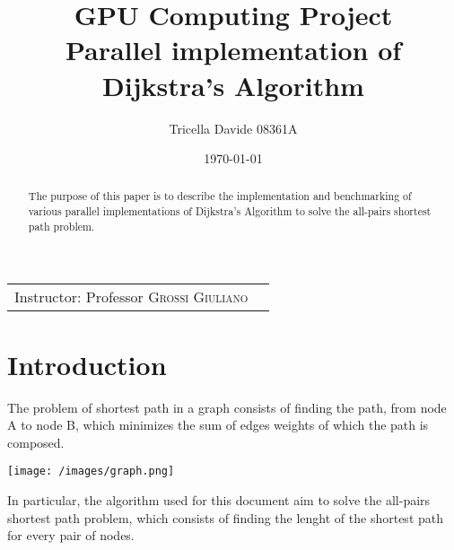 \documentclass[
	a4paper, %
	12pt, %
]{class}
\title{GPU Computing Project\\Parallel implementation of Dijkstra's Algorithm} %
\author{Tricella Davide 08361A} %
\date{\today} %
\begin{document}
\maketitle %

\begin{center}
    \begin{tabular}{l r}
        Instructor: Professor \textsc{Grossi Giuliano}
    \end{tabular}
\end{center}


\begin{abstract}
    The purpose of this paper is to describe the implementation and benchmarking of various parallel implementations of Dijkstra's Algorithm to solve the all-pairs shortest path problem.
\end{abstract}


\tableofcontents
\newpage

\section{Introduction}

The problem of shortest path in a graph consists of finding the path, from node A to node B,
which minimizes the sum of edges weights of which the path is composed.\\

\begin{center}
    \texttt{[image: /images/graph.png]}
\end{center}

In particular, the algorithm used for this document aim to solve the all-pairs shortest path problem,
which consists of finding the lenght of the shortest path for every pair of nodes.\\
\end{document}
